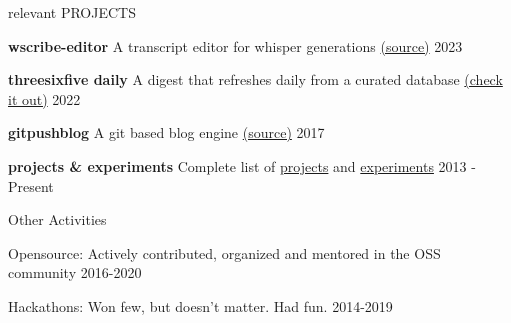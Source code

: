 \documentclass{resume} %
\begin{document}

\begin{rSection}{relevant PROJECTS}
  \vspace{-1.25em}
  \item \textbf{wscribe-editor} {A transcript editor for whisper generations \href{https://github.com/geekodour/wscribe-editor}{(source)}} \hfill 2023
  \item \textbf{threesixfive daily} {A digest that refreshes daily from a curated database \href{https://daily.threesixfive.shop/}{(check it out)}
  } \hfill 2022
  \item \textbf{gitpushblog} {A git based blog engine \href{https://github.com/geekodour/gitpushblog}{(source)}} \hfill 2017
  \item \textbf{projects \& experiments} {Complete list of \href{https://geekodour.org/docs/updates/projects/}{projects} and
 \href{https://geekodour.org/docs/updates/experiments/}{experiments}
  } \hfill 2013 - Present
\end{rSection}

\begin{rSection}{Other Activities}
  \vspace{-1.25em}
    \item Opensource: Actively contributed, organized and mentored in the OSS community \hfill 2016-2020
    \item Hackathons: Won few, but doesn't matter. Had fun. \hfill 2014-2019
\end{rSection}




\end{document}

